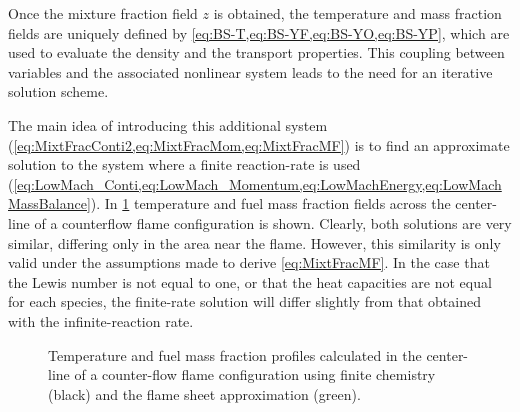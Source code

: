  Once the mixture fraction field $z$ is obtained, the temperature and mass fraction fields are uniquely defined by \cref{eq:BS-T,eq:BS-YF,eq:BS-YO,eq:BS-YP}, which are used to evaluate the density and the transport properties. This coupling between variables and the associated nonlinear system leads to the need for an iterative solution scheme.
 
 The main idea of introducing this additional system (\cref{eq:MixtFracConti2,eq:MixtFracMom,eq:MixtFracMF}) is to find an approximate solution to the system where a finite reaction-rate is used (\cref{eq:LowMach_Conti,eq:LowMach_Momentum,eq:LowMachEnergy,eq:LowMachMassBalance}). In \cref{fig:MixtureFraction_finiteRateComparison} temperature and fuel mass fraction fields across the center-line of a counterflow flame configuration is shown. Clearly, both solutions are very similar, differing only in the area near the flame. However, this similarity is only valid under the assumptions made to derive \cref{eq:MixtFracMF}. In the case that the Lewis number is not equal to one, or that the heat capacities are not equal for each species, the finite-rate solution will differ slightly from that obtained with the infinite-reaction rate. 
\newpage
\begin{figure}[tb]
	\centering
	\caption{ Temperature and fuel mass fraction profiles calculated in the center-line of a counter-flow flame configuration using finite chemistry (black) and the flame sheet approximation (green). }
	\label{fig:MixtureFraction_finiteRateComparison}
\end{figure}
\newpage
